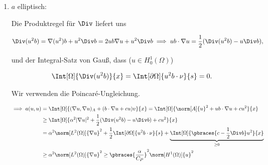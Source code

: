 \begin{solution}
\begin{enumerate}[label = \textbf{\alph*)}]
\begin{enumerate}[label = \arabic*.]
    \item $a$ elliptisch:
    
    Die Produktregel für $\Div$ liefert uns
    
    \begin{align*}
      \Div(u^2 b) = \nabla(u^2) b + u^2 \Div b = 2 u b \nabla u + u^2 \Div b
      \implies
      u b \cdot \nabla u = \frac{1}{2} (\Div(u^2 b) - u \Div b),
    \end{align*}

    und der Integral-Satz von Gauß, dass ($u \in H_0^1(\Omega)$)

    \begin{align*}
      \Int[\Omega]{\Div (u^2 b)}{x}
      =
      \Int[\partial \Omega]{u^2 b \cdot \nu}{s}
      =
      0.
    \end{align*}

    Wir verwenden die Poincaré-Ungleichung.


    \begin{align*}
      \implies
      a(u, u)
      & =
      \Int[\Omega]{(\nabla u, \nabla u)_A + (b \cdot \nabla u + c u) v}{x}
      =
      \Int[\Omega]{\norm[A]{u}^2 + u b \cdot \nabla u + c u^2}{x} \\
      & \geq
      \Int[\Omega]{\alpha^2 |\nabla u|^2 + \frac{1}{2} (\Div(u^2 b) - u \Div b) + c u^2}{x} \\
      & =
      \alpha^2 \norm[L^2(\Omega)]{\nabla u}^2
      +
      \frac{1}{2} \Int[\partial \Omega]{u^2 b \cdot \nu}{s}
      +
      \underbrace
      {
        \Int[\Omega]{\pbraces{c - \frac{1}{2} \Div b} u^2}{x}
      }_{
        \geq 0
      } \\
      & \geq
      \alpha^2 \norm[L^2(\Omega)]{\nabla u}^2
      \geq
      \pbraces{\frac{\alpha}{C_P}}^2 \norm[H^1(\Omega)]{u}^2
    \end{align*}

  \end{enumerate}

\end{enumerate}

\end{solution}

